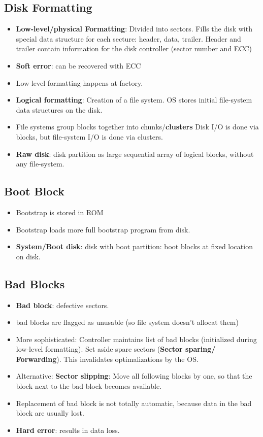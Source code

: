 \documentclass[10pt]{report}
\begin{document}
		\subsection{Disk Formatting}
			\begin{itemize}
				\item \textbf{Low-level/physical Formatting}: Divided into sectors. Fills the disk with special data structure for each secture: header, data, trailer. Header and trailer contain information for the disk controller (sector number and ECC)
				\item \textbf{Soft error}: can be recovered with ECC
				\item Low level formatting happens at factory.
				\item \textbf{Logical formatting}: Creation of a file system. OS stores initial file-system data structures on the disk.
				\item File systems group blocks together into chunks/\textbf{clusters} Disk I/O is done via blocks, but file-system I/O is done via clusters.
				\item \textbf{Raw disk}: disk partition as large sequential array of logical blocks, without any file-system.
			\end{itemize}

		\subsection{Boot Block}
			\begin{itemize}
				\item Bootstrap is stored in ROM
				\item Bootstrap loads more full bootstrap program from disk.
				\item \textbf{System/Boot disk}: disk with boot partition: boot blocks at fixed location on disk.
			\end{itemize}

		\subsection{Bad Blocks}
			\begin{itemize}
				\item \textbf{Bad block}: defective sectors.
				\item bad blocks are flagged as unusable (so file system doesn't allocat them)
				\item More sophisticated: Controller maintains list of bad blocks (initialized during low-level formatting). Set aside spare sectors (\textbf{Sector sparing/ Forwarding}). This invalidates optimalizations by the OS.
				\item Alternative: \textbf{Sector slipping}: Move all following blocks by one, so that the block next to the bad block becomes available.
				\item Replacement of bad block is not totally automatic, because data in the bad block are usually lost.
				\item \textbf{Hard error}: results in data loss.
			\end{itemize}
\end{document}
